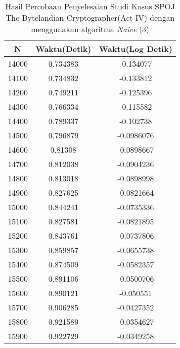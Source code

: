 \begin{table}[H]
\centering
\caption {Hasil Percobaan Penyelesaian Studi Kasus SPOJ The Bytelandian Cryptographer(Act IV) dengan menggunakan algoritma \textit{Naive} (3)}
\begin{tabular}{|c|c|c|}\hline
N&Waktu(Detik)&Waktu(Log Detik)\\ \hline
14000&0.734383&-0.134077\\ \hline
14100&0.734832&-0.133812\\ \hline
14200&0.749211&-0.125396\\ \hline
14300&0.766334&-0.115582\\ \hline
14400&0.789337&-0.102738\\ \hline
14500&0.796879&-0.0986076\\ \hline
14600&0.81308&-0.0898667\\ \hline
14700&0.812038&-0.0904236\\ \hline
14800&0.813018&-0.0898998\\ \hline
14900&0.827625&-0.0821664\\ \hline
15000&0.844241&-0.0735336\\ \hline
15100&0.827581&-0.0821895\\ \hline
15200&0.843761&-0.0737806\\ \hline
15300&0.859857&-0.0655738\\ \hline
15400&0.874509&-0.0582357\\ \hline
15500&0.891106&-0.0500706\\ \hline
15600&0.890121&-0.050551\\ \hline
15700&0.906285&-0.0427352\\ \hline
15800&0.921589&-0.0354627\\ \hline
15900&0.922729&-0.0349258\\ \hline
\end{tabular}
\label{tab:res6}
\end{table}
